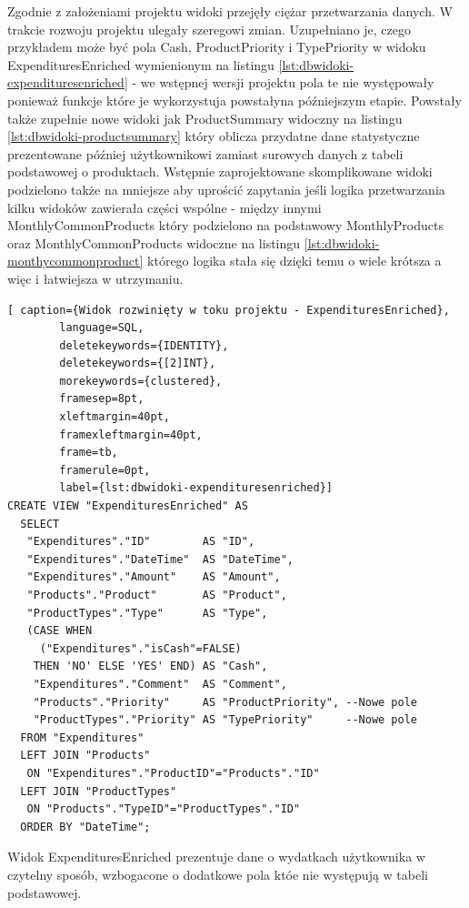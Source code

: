 \documentclass[a4paper,10pt, twoside]{report}
\begin{document}
\begin{large}
{Zgodnie z założeniami projektu widoki przejęły ciężar przetwarzania danych. W 
trakcie rozwoju projektu ulegały szeregowi zmian. Uzupełniano je, 
czego przykładem może być pola Cash, ProductPriority i TypePriority w widoku 
ExpendituresEnriched wymienionym na listingu 
\ref*{lst:dbwidoki-expendituresenriched} - we wstępnej wersji projektu pola te 
nie występowały ponieważ funkcje które je wykorzystuja powstałyna późniejszym 
etapie. Powstały także zupełnie nowe widoki jak ProductSummary widoczny na 
listingu \ref*{lst:dbwidoki-productsummary} który oblicza przydatne dane 
statystyczne prezentowane później użytkownikowi zamiast surowych danych z tabeli
 podstawowej o produktach. Wstępnie zaprojektowane skomplikowane widoki 
podzielono także na mniejsze aby uprościć zapytania jeśli logika przetwarzania 
kilku widoków zawierała części wspólne - między innymi MonthlyCommonProducts 
który podzielono na podstawowy MonthlyProducts oraz MonthlyCommonProducts 
widoczne na listingu \ref*{lst:dbwidoki-monthycommonproduct} którego logika 
stała się dzięki temu o wiele krótsza a więc i łatwiejsza w utrzymaniu.}

\begin{minipage}{\textwidth}
    \begin{lstlisting}[ caption={Widok rozwinięty w toku projektu - ExpendituresEnriched},
        language=SQL,
        deletekeywords={IDENTITY},
        deletekeywords={[2]INT},
        morekeywords={clustered},
        framesep=8pt,
        xleftmargin=40pt,
        framexleftmargin=40pt,
        frame=tb,
        framerule=0pt,
        label={lst:dbwidoki-expendituresenriched}]
CREATE VIEW "ExpendituresEnriched" AS
  SELECT
   "Expenditures"."ID"        AS "ID",
   "Expenditures"."DateTime"  AS "DateTime",
   "Expenditures"."Amount"    AS "Amount",
   "Products"."Product"       AS "Product",
   "ProductTypes"."Type"      AS "Type",
   (CASE WHEN 
     ("Expenditures"."isCash"=FALSE)
    THEN 'NO' ELSE 'YES' END) AS "Cash",
    "Expenditures"."Comment"  AS "Comment",
    "Products"."Priority"     AS "ProductPriority", --Nowe pole
    "ProductTypes"."Priority" AS "TypePriority"     --Nowe pole
  FROM "Expenditures"
  LEFT JOIN "Products"
   ON "Expenditures"."ProductID"="Products"."ID"
  LEFT JOIN "ProductTypes"
   ON "Products"."TypeID"="ProductTypes"."ID"
  ORDER BY "DateTime";\end{lstlisting}
{Widok ExpendituresEnriched prezentuje dane o wydatkach użytkownika w czytelny 
sposób, wzbogacone o dodatkowe pola któe nie występują w tabeli podstawowej.}
\end{minipage}


\end{large}
\end{document}
